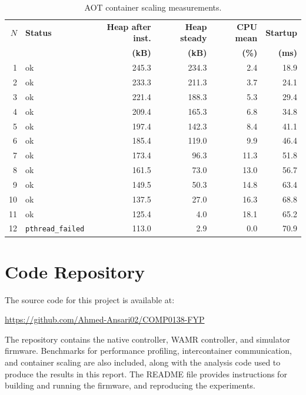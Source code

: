 \documentclass[12pt, a4paper]{report}
\begin{document}
\begin{table}[htbp]
\centering
\small
\begin{tabular}{@{}rlrrrr@{}}
\toprule
\textbf{$N$} & \textbf{Status} & \textbf{Heap after inst.} & \textbf{Heap steady} & \textbf{CPU mean} & \textbf{Startup} \\
 &  & \textbf{(kB)} & \textbf{(kB)} & \textbf{(\%)} & \textbf{(ms)} \\
\midrule
1  & ok              & 245.3 & 234.3 &  2.4 & 18.9 \\
2  & ok              & 233.3 & 211.3 &  3.7 & 24.1 \\
3  & ok              & 221.4 & 188.3 &  5.3 & 29.4 \\
4  & ok              & 209.4 & 165.3 &  6.8 & 34.8 \\
5  & ok              & 197.4 & 142.3 &  8.4 & 41.1 \\
6  & ok              & 185.4 & 119.0 &  9.9 & 46.4 \\
7  & ok              & 173.4 &  96.3 & 11.3 & 51.8 \\
8  & ok              & 161.5 &  73.0 & 13.0 & 56.7 \\
9  & ok              & 149.5 &  50.3 & 14.8 & 63.4 \\
10 & ok              & 137.5 &  27.0 & 16.3 & 68.8 \\
11 & ok              & 125.4 &   4.0 & 18.1 & 65.2 \\
12 & \texttt{pthread\_failed} & 113.0 &   2.9 &  0.0 & 70.9 \\
\bottomrule
\end{tabular}
\caption{AOT container scaling measurements.}
\label{tab:scaling-aot}
\end{table}

\chapter{Code Repository}
\label{app:code-repository}

The source code for this project is available at:

\begin{center}
\url{https://github.com/Ahmed-Ansari02/COMP0138-FYP}
\end{center}

The repository contains the native controller, WAMR controller, and simulator firmware. Benchmarks for performance profiling, intercontainer communication, and container scaling are also included, along with the analysis code used to produce the results in this report. The README file provides instructions for building and running the firmware, and reproducing the experiments. 
\end{document}
